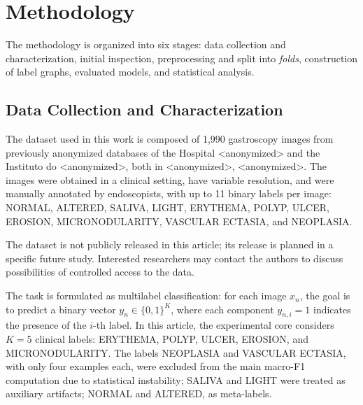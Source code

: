 \documentclass[12pt]{article}
\begin{document}

\section{Methodology}
\label{sec:Methodology}

The methodology is organized into six stages: data collection and characterization, initial inspection, preprocessing and split into \textit{folds}, construction of label graphs, evaluated models, and statistical analysis.

\subsection{Data Collection and Characterization}

The dataset used in this work is composed of 1,990 gastroscopy images from previously anonymized databases of the Hospital \textless{}anonymized\textgreater{} and the Instituto do \textless{}anonymized\textgreater{}, both in \textless{}anonymized\textgreater{}, \textless{}anonymized\textgreater{}. The images were obtained in a clinical setting, have variable resolution, and were manually annotated by endoscopists, with up to 11 binary labels per image: NORMAL, ALTERED, SALIVA, LIGHT, ERYTHEMA, POLYP, ULCER, EROSION, MICRONODULARITY, VASCULAR ECTASIA, and NEOPLASIA.

The dataset is not publicly released in this article; its release is planned in a specific future study. Interested researchers may contact the authors to discuss possibilities of controlled access to the data.

The task is formulated as multilabel classification: for each image $x_n$, the goal is to predict a binary vector $y_n \in \{0,1\}^K$, where each component $y_{n,i}=1$ indicates the presence of the $i$-th label. In this article, the experimental core considers $K=5$ clinical labels: ERYTHEMA, POLYP, ULCER, EROSION, and MICRONODULARITY. The labels NEOPLASIA and VASCULAR ECTASIA, with only four examples each, were excluded from the main macro-F1 computation due to statistical instability; SALIVA and LIGHT were treated as auxiliary artifacts; NORMAL and ALTERED, as meta-labels.
\end{document}
